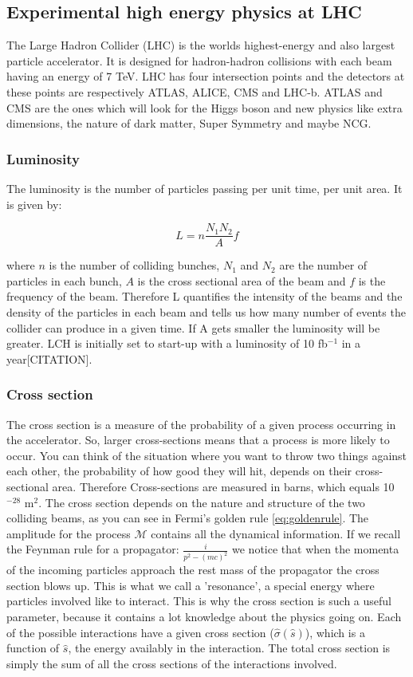\subsection{Experimental high energy physics at LHC}
The Large Hadron Collider (LHC) is the worlds highest-energy and also largest particle accelerator. It is designed for hadron-hadron collisions with each beam having an energy of 7 TeV. LHC has four intersection points and the detectors at these points are respectively ATLAS, ALICE, CMS and LHC-b. ATLAS and CMS are the ones which will look for the Higgs boson and new physics like extra dimensions, the nature of dark matter, Super Symmetry and maybe NCG. 

\subsubsection{Luminosity}
The luminosity is the number of particles passing per unit time, per unit area. It is given by:

\begin{equation}
L=n\frac{N_{1}N_{2}}{A}f
\end{equation}

where $n$ is the number of colliding bunches, $N_{1}$ and $N_{2}$ are the number of particles in each bunch, $A$ is the cross sectional area of the beam and $f$ is the frequency of the beam. Therefore L quantifies the intensity of the beams and the density of the particles in each beam and tells us how many number of events the collider can produce in a given time. If A gets smaller the luminosity will be greater. LCH is initially set to start-up with a luminosity of 10 fb$^{-1}$ in a year[CITATION].

\subsubsection{Cross section}
The cross section is a measure of the probability of a given process occurring in the accelerator. So, larger cross-sections means that a process is more likely to occur. You can think of the situation where you want to throw two things against each other, the probability of how good they will hit, depends on their cross-sectional area. Therefore Cross-sections are measured in barns, which equals 10$^{-28}$ m$^{2}$.
The cross section depends on the nature and structure of the two colliding beams, as you can see in Fermi's golden rule \eqref{eq:goldenrule}. The amplitude for the process $\mathcal{M}$ contains all the dynamical information. If we recall the Feynman rule for a propagator: $\frac{i}{p^{2}-(mc)^{2}}$ we notice that when the momenta of the incoming particles approach the rest mass of the propagator the cross section blows up. This is what we call a 'resonance', a special energy where particles involved like to interact. This is why the cross section is such a useful parameter, because it contains a lot knowledge about the physics going on. Each of the possible interactions have a given cross section ($\hat \sigma(\hat s)$), which is a function of $\hat s$, the energy availably in the interaction. The total cross section is simply the sum of all the cross sections of the interactions involved\cite{griffiths1987iep}.

